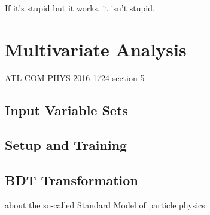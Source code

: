 \begin{savequote}[75mm]
If it's stupid but it works, it isn't stupid.
\end{savequote}

\chapter{Multivariate Analysis}
ATL-COM-PHYS-2016-1724 section 5

\section{Input Variable Sets}
\section{Setup and Training}
\section{BDT Transformation}

 about the so-called Standard Model of particle physics



